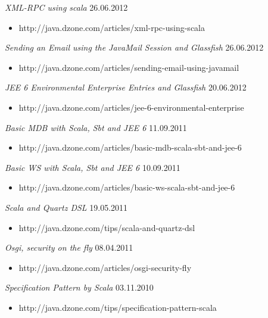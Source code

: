 \documentclass{res}
\begin{document}
\begin{resume}
{\sl XML-RPC using scala}  \hfill    26.06.2012	\\
\begin{itemize}
\item[] http://java.dzone.com/articles/xml-rpc-using-scala
\end{itemize}

{\sl Sending an Email using the JavaMail Session and Glassfish}  \hfill    26.06.2012 \\
\begin{itemize}
\item[] http://java.dzone.com/articles/sending-email-using-javamail
\end{itemize}

{\sl JEE 6 Environmental Enterprise Entries and Glassfish}  \hfill    20.06.2012	\\
\begin{itemize}
\item[] http://java.dzone.com/articles/jee-6-environmental-enterprise
\end{itemize}

{\sl Basic MDB with Scala, Sbt and JEE 6}  \hfill   11.09.2011	\\
\begin{itemize}
\item[] http://java.dzone.com/articles/basic-mdb-scala-sbt-and-jee-6
\end{itemize}

{\sl Basic WS with Scala, Sbt and JEE 6}  \hfill   10.09.2011	\\
\begin{itemize}
\item[] http://java.dzone.com/articles/basic-ws-scala-sbt-and-jee-6
\end{itemize}

{\sl Scala and Quartz DSL}  \hfill   19.05.2011	\\
\begin{itemize}
\item[] http://java.dzone.com/tips/scala-and-quartz-dsl
\end{itemize}

{\sl Osgi, security on the fly}  \hfill    08.04.2011	\\
\begin{itemize}
\item[] http://java.dzone.com/articles/osgi-security-fly
\end{itemize}

{\sl Specification Pattern by Scala}  \hfill   03.11.2010	\\
\begin{itemize}
\item[] http://java.dzone.com/tips/specification-pattern-scala
\end{itemize}


\end{resume}
\end{document}
